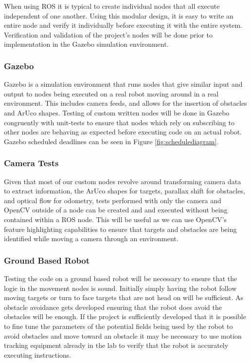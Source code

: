 \documentclass{article}
\begin{document}
	When using ROS it is typical to create individual nodes that all execute independent of one another. Using this modular design, it is easy to write an entire node and verify it individually before executing it with the entire system.	Verification and validation of the project's nodes will be done prior to implementation in the Gazebo simulation environment.
	
	\subsubsection{Gazebo}
	
	Gazebo is a simulation environment that runs nodes that give similar input and output to nodes being executed on a real robot moving around in a real environment. This includes camera feeds, and allows for the insertion of obstacles and ArUco shapes. Testing of custom written nodes will be done in Gazebo congruently with unit-tests to ensure that nodes which rely on subscribing to other nodes are behaving as expected before executing code on an actual robot. Gazebo scheduled deadlines can be seen in Figure \ref{fig:schedulediagram}.
	
	\subsubsection{Camera Tests}
	
	Given that most of our custom nodes revolve around transforming camera data to extract information, the ArUco shapes for targets, parallax shift for obstacles, and optical flow for odometry, tests performed with only the camera and OpenCV outside of a node can be created and and executed without being contained within a ROS node. This will be useful as we can use OpenCV's feature highlighting capabilities to ensure that targets and obstacles are being identified while moving a camera through an environment. 
	
	\subsubsection{Ground Based Robot}
	
	Testing the code on a ground based robot will be necessary to ensure that the logic in the movement nodes is sound. Initially simply having the robot follow moving targets or turn to face targets that are not head on will be sufficient. As obstacle avoidance gets developed ensuring that the robot does avoid the obstacles will be enough. If the project is sufficiently developed that it is possible to fine tune the parameters of the potential fields being used by the robot to avoid obstacles and move toward an obstacle it may be necessary to use motion tracking equipment already in the lab to verify that the robot is accurately executing instructions.
	
\end{document}
